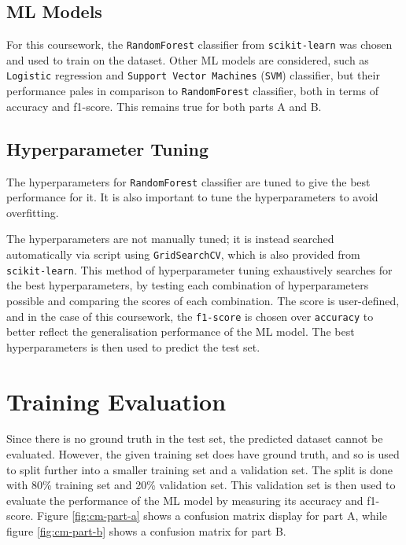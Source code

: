 \documentclass[12pt]{article}
\begin{document}
        \subsection{ML Models}

            For this coursework, the \verb|RandomForest| classifier from \verb|scikit-learn| was chosen and used to
            train on the dataset. Other ML models are considered, such as \verb|Logistic| regression and 
            \verb|Support Vector Machines| (\verb|SVM|) classifier, but their performance pales in comparison to 
            \verb|RandomForest| classifier, both in terms of accuracy and f1-score. This remains true for both parts
            A and B. 

        \subsection{Hyperparameter Tuning}

            The hyperparameters for \verb|RandomForest| classifier are tuned to give the best performance for it. It is
            also important to tune the hyperparameters to avoid overfitting. 
            
            The hyperparameters are not manually tuned; it is instead searched automatically via script using 
            \verb|GridSearchCV|, which is also provided from \verb|scikit-learn|. This method of hyperparameter tuning
            exhaustively searches for the best hyperparameters, by testing each combination of hyperparameters possible
            and comparing the scores of each combination. The score is user-defined, and in the case of this 
            coursework, the \verb|f1-score| is chosen over \verb|accuracy| to better reflect the generalisation 
            performance of the ML model. The best hyperparameters is then used to predict the test set.

    \section{Training Evaluation}

        Since there is no ground truth in the test set, the predicted dataset cannot be evaluated. However, the given
        training set does have ground truth, and so is used to split further into a smaller training set and a 
        validation set. The split is done with 80\% training set and 20\% validation set. This validation set is then
        used to evaluate the performance of the ML model by measuring its accuracy and f1-score. Figure 
        \ref{fig:cm-part-a} shows a confusion matrix display for part A, while figure \ref{fig:cm-part-b} shows a
        confusion matrix for part B.
\end{document}
